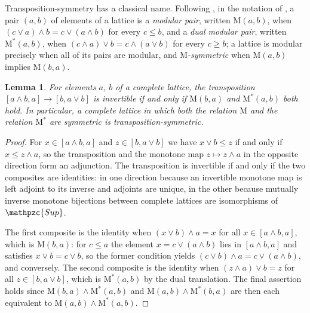 \documentclass[reqno,a4paper]{amsart}
\numberwithin{equation}{section}
\theoremstyle{plain}
\newtheorem{lemma}[subsection]{Lemma}
\theoremstyle{definition}
\def\dfn#1{{\itshape #1}}
\newcommand{\catfont}[1]{\ensuremath{\mathpzc{#1}}\xspace}
\newcommand{\Sup}{\catfont{Sup}}
\renewcommand{\1}{\onecat{1}}
\begin{document}
Transposition-symmetry has a classical name. Following \cite{MaeMae70}, in the notation of \cite[\S2]{Schreiner66}, a pair \((a,b)\) of elements of a lattice is a \dfn{modular pair}, written \(\mathrm{M}(a,b)\), when \((c\vee a)\wedge b=c\vee(a\wedge b)\) for every \(c\leq b\), and a \dfn{dual modular pair}, written \(\mathrm{M}^{*}(a,b)\), when \((c\wedge a)\vee b=c\wedge(a\vee b)\) for every \(c\geq b\); a lattice is modular precisely when all of its pairs are modular, and \dfn{\(\mathrm{M}\)-symmetric} when \(\mathrm{M}(a,b)\) implies \(\mathrm{M}(b,a)\).

\begin{lemma}\label{L:ModularPairs}
	For elements \(a\), \(b\) of a complete lattice, the transposition \([a\wedge b,a]\to[b,a\vee b]\) is invertible if and only if \(\mathrm{M}(b,a)\) and \(\mathrm{M}^{*}(a,b)\) both hold. In particular, a complete lattice in which both the relation \(\mathrm{M}\) and the relation \(\mathrm{M}^{*}\) are symmetric is transposition-symmetric.
\end{lemma}
\begin{proof}
	For \(x\in[a\wedge b,a]\) and \(z\in[b,a\vee b]\) we have \(x\vee b\leq z\) if and only if \(x\leq z\wedge a\), so the transposition and the monotone map \(z\mapsto z\wedge a\) in the opposite direction form an adjunction. The transposition is invertible if and only if the two composites are identities: in one direction because an invertible monotone map is left adjoint to its inverse and adjoints are unique, in the other because mutually inverse monotone bijections between complete lattices are isomorphisms of \(\Sup\).

	The first composite is the identity when \((x\vee b)\wedge a=x\) for all \(x\in[a\wedge b,a]\), which is \(\mathrm{M}(b,a)\): for \(c\leq a\) the element \(x=c\vee(a\wedge b)\) lies in \([a\wedge b,a]\) and satisfies \(x\vee b=c\vee b\), so the former condition yields \((c\vee b)\wedge a=c\vee(a\wedge b)\), and conversely. The second composite is the identity when \((z\wedge a)\vee b=z\) for all \(z\in[b,a\vee b]\), which is \(\mathrm{M}^{*}(a,b)\) by the dual translation. The final assertion holds since \(\mathrm{M}(b,a)\wedge\mathrm{M}^{*}(a,b)\) and \(\mathrm{M}(a,b)\wedge\mathrm{M}^{*}(b,a)\) are then each equivalent to \(\mathrm{M}(a,b)\wedge\mathrm{M}^{*}(a,b)\).
\end{proof}
\end{document}

